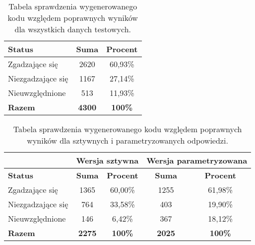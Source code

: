 
\begin{table}[H]
\caption{Tabela sprawdzenia wygenerowanego kodu względem poprawnych wyników dla wszystkich danych testowych.}\label{tab:tabela4}
\centering%
\begin{tabular}{|l|c|c|}
\hline
\textbf{Status} & \textbf{Suma} & \textbf{Procent} \\
\hline
Zgadzające się & 2620 & 60,93\% \\
\hline
Niezgadzające się & 1167 & 27,14\% \\
\hline
Nieuwzględnione & 513 & 11,93\% \\
\hline
\textbf{Razem} & \textbf{4300} & \textbf{100\%} \\
\hline
\end{tabular}
\end{table}


\begin{table}[H]
\caption{Tabela sprawdzenia wygenerowanego kodu względem poprawnych wyników dla sztywnych i parametryzowanych odpowiedzi.}\label{tab:experiment:combined2}
\centering%
\begin{tabular}{|l|c|c|c|c|}
\hline
 & \multicolumn{2}{c|}{\textbf{Wersja sztywna}} & \multicolumn{2}{c|}{\textbf{Wersja parametryzowana}} \\
\hline
\textbf{Status} & \textbf{Suma} & \textbf{Procent} & \textbf{Suma} & \textbf{Procent} \\
\hline
Zgadzające się & 1365 & 60,00\% & 1255 & 61,98\% \\
\hline
Niezgadzające się & 764 & 33,58\% & 403 & 19,90\% \\
\hline
Nieuwzględnione & 146 & 6,42\% & 367 & 18,12\%\\
\hline
\textbf{Razem} & \textbf{2275} & \textbf{100\%} & \textbf{2025} & \textbf{100\%} \\
\hline
\end{tabular}
\end{table}

